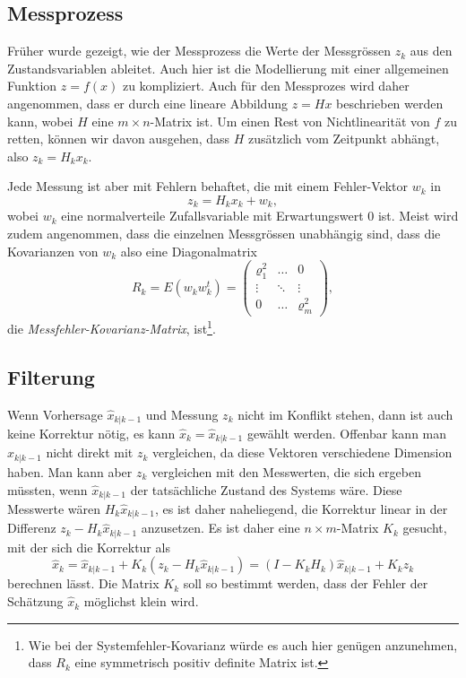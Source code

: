 \subsection{Messprozess\label{subsection:messprozess}}
Früher wurde gezeigt, wie der Messprozess die Werte der Messgrössen $z_k$
aus den Zustandsvariablen ableitet.
Auch hier ist die Modellierung mit einer allgemeinen Funktion $z=f(x)$ 
zu kompliziert.
Auch für den Messprozes wird daher angenommen, dass er durch eine
lineare Abbildung $z=Hx$ beschrieben werden kann, wobei $H$ eine
$m\times n$-Matrix ist.
Um einen Rest von Nichtlinearität von $f$ zu retten, können wir davon
ausgehen, dass $H$ zusätzlich vom Zeitpunkt abhängt, also $z_k=H_kx_k$.

Jede Messung ist aber mit Fehlern behaftet, die mit einem Fehler-Vektor
$w_k$ in
\begin{equation}
z_k = H_kx_k + w_k,
\label{skript:kalman:messfehler}
\end{equation}
wobei $w_k$ eine normalverteile Zufallsvariable mit Erwartungswert $0$
ist.
Meist wird zudem angenommen, dass die einzelnen Messgrössen unabhängig
sind, dass die Kovarianzen von $w_k$ also eine
Diagonalmatrix
\[
R_k = E(w_kw_k^t) =
\begin{pmatrix}
\varrho_1^2&\dots & 0\\
\vdots     &\ddots&\vdots\\
0          &\dots &\varrho_m^2
\end{pmatrix},
\]
die {\em Messfehler-Kovarianz-Matrix},
ist\footnote{Wie bei der Systemfehler-Kovarianz würde es auch hier
genügen anzunehmen, dass $R_k$ eine symmetrisch positiv definite Matrix
ist.}.
%
%

\subsection{Filterung\label{subsection:filterung}}
Wenn Vorhersage $\hat{x}_{k|k-1}$ und Messung $z_k$ nicht im Konflikt
stehen, dann ist auch keine Korrektur nötig, es kann
$\hat{x}_k = \hat{x}_{k|k-1}$ gewählt werden.
Offenbar kann man $\hat{x}_{k|k-1}$ nicht direkt mit $z_k$ vergleichen,
da diese Vektoren verschiedene Dimension haben.
Man kann aber $z_k$ vergleichen mit den Messwerten, die sich ergeben
müssten, wenn $\hat{x}_{k|k-1}$ der tatsächliche Zustand des Systems
wäre.
Diese Messwerte wären $H_k\hat{x}_{k|k-1}$, es ist daher naheliegend,
die Korrektur linear in der Differenz $z_k-H_k\hat{x}_{k|k-1}$
anzusetzen.
Es ist daher eine $n\times m$-Matrix $K_k$ gesucht, mit der sich
die Korrektur als
\begin{equation}
\hat{x}_{k}
=
\hat{x}_{k|k-1} + K_k(z_k-H_k\hat{x}_{k|k-1})
=
(I-K_kH_k)\hat{x}_{k|k-1} + K_kz_k
\label{skript:kalman:filter}
\end{equation}
berechnen lässt.
Die Matrix $K_k$ soll so bestimmt werden, dass der Fehler der
Schätzung $\hat{x}_k$ möglichst klein wird.

